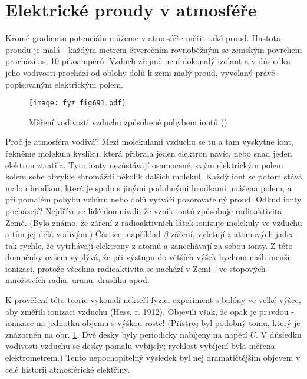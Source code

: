   \section{Elektrické proudy v atmosféře}\label{fyz:IIchapIXsecII}   
    Kromě gradientu potenciálu můžeme v atmosféře měřit také proud. Hustota proudu je malá - každým
    metrem čtverečním rovnoběžným se zemským povrchem prochází asi \num{10} pikoampérů. Vzduch
    zřejmě není dokonalý izolant a v důsledku jeho vodivosti prochází od oblohy dolů k zemi malý
    proud, vyvolaný právě popisovaným elektrickým polem.

    \begin{figure}[ht!] %
      \centering
      \texttt{[image: fyz\_fig691.pdf]}
      \caption{Měření vodivosti vzduchu způsobené pohybem iontů
               (\cite[s.~707]{Feynman02})}
      \label{fyz:fig691}
    \end{figure}

    Proč je atmosféra vodivá? Mezi molekulami vzduchu se tu a tam vyskytne iont, řekněme molekula
    kyslíku, která přibrala jeden elektron navíc, nebo snad jeden elektron ztratila. Tyto ionty
    nezůstávají osamocené; svým elektrickým polem kolem sebe obvykle shromáždí několik dalších
    molekul. Každý iont se potom stává malou hrudkou, která je spolu s jinými podobnými hrudkami
    unášena polem, a při pomalém pohybu vzhůru nebo dolů vytváří pozorovatelný proud. Odkud ionty
    pocházejí? Nejdříve se lidé domnívali, že vznik iontů způsobuje radioaktivita Země. (Bylo známo,
    že záření z radioaktivních látek ionizuje molekuly ve vzduchu a tím jej dělá vodivým.) Částice,
    například \(\beta\)-záření, vyletují z atomových jader tak rychle, že vytrhávají elektrony z
    atomů a zanechávají za sebou ionty. Z této domněnky ovšem vyplývá, že při výstupu do větších
    výšek bychom našli menší ionizaci, protože všechna radioaktivita se nachází v Zemi - ve
    stopových množstvích radia, uranu, draslíku apod.

    K prověření této teorie vykonali někteří fyzici experiment s balóny ve velké výšce, aby změřili
    ionizaci vzduchu (Hess, r. 1912). Objevili však, že opak je pravdou - ionizace na jednotku
    objemu s výškou roste! (Přístroj byl podobný tomu, který je znázorněn na obr. \ref{fyz:fig691}.
    Dvě desky byly periodicky nabíjeny na napětí \(U\). V důsledku vodivosti vzduchu se desky pomalu
    vybíjely; rychlost vybíjení byla měřena elektrometrem.) Tento nepochopitelný výsledek byl nej
    dramatičtějším objevem v celé historii atmosférické elektřiny.

